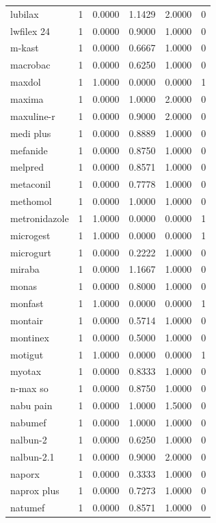 \begin{longtable}{p{3.0cm}rrrrr}
lubilax & 1 & 0.0000 & 1.1429 & 2.0000 & 0 \\
lwfilex 24 & 1 & 0.0000 & 0.9000 & 1.0000 & 0 \\
m-kast & 1 & 0.0000 & 0.6667 & 1.0000 & 0 \\
macrobac & 1 & 0.0000 & 0.6250 & 1.0000 & 0 \\
maxdol & 1 & 1.0000 & 0.0000 & 0.0000 & 1 \\
maxima & 1 & 0.0000 & 1.0000 & 2.0000 & 0 \\
maxuline-r & 1 & 0.0000 & 0.9000 & 2.0000 & 0 \\
medi plus & 1 & 0.0000 & 0.8889 & 1.0000 & 0 \\
mefanide & 1 & 0.0000 & 0.8750 & 1.0000 & 0 \\
melpred & 1 & 0.0000 & 0.8571 & 1.0000 & 0 \\
metaconil & 1 & 0.0000 & 0.7778 & 1.0000 & 0 \\
methomol & 1 & 0.0000 & 1.0000 & 1.0000 & 0 \\
metronidazole & 1 & 1.0000 & 0.0000 & 0.0000 & 1 \\
microgest & 1 & 1.0000 & 0.0000 & 0.0000 & 1 \\
microgurt & 1 & 0.0000 & 0.2222 & 1.0000 & 0 \\
miraba & 1 & 0.0000 & 1.1667 & 1.0000 & 0 \\
monas & 1 & 0.0000 & 0.8000 & 1.0000 & 0 \\
monfast & 1 & 1.0000 & 0.0000 & 0.0000 & 1 \\
montair & 1 & 0.0000 & 0.5714 & 1.0000 & 0 \\
montinex & 1 & 0.0000 & 0.5000 & 1.0000 & 0 \\
motigut & 1 & 1.0000 & 0.0000 & 0.0000 & 1 \\
myotax & 1 & 0.0000 & 0.8333 & 1.0000 & 0 \\
n-max so & 1 & 0.0000 & 0.8750 & 1.0000 & 0 \\
nabu pain & 1 & 0.0000 & 1.0000 & 1.5000 & 0 \\
nabumef & 1 & 0.0000 & 1.0000 & 1.0000 & 0 \\
nalbun-2 & 1 & 0.0000 & 0.6250 & 1.0000 & 0 \\
nalbun-2.1 & 1 & 0.0000 & 0.9000 & 2.0000 & 0 \\
naporx & 1 & 0.0000 & 0.3333 & 1.0000 & 0 \\
naprox plus & 1 & 0.0000 & 0.7273 & 1.0000 & 0 \\
natumef & 1 & 0.0000 & 0.8571 & 1.0000 & 0 \\

\end{longtable}
